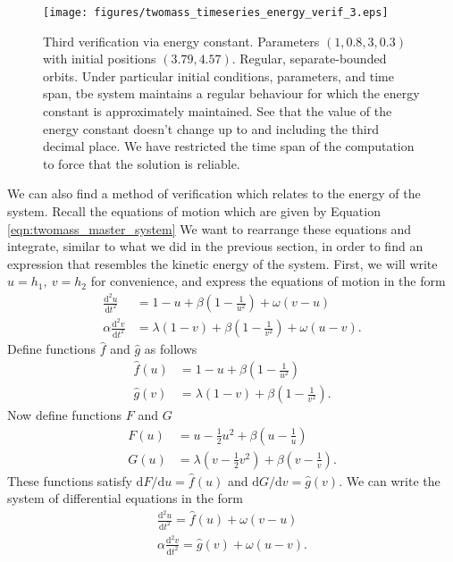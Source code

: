\documentclass{article}
\begin{document}
\begin{figure}
    \centering
    \texttt{[image: figures/twomass\_timeseries\_energy\_verif\_3.eps]}
    \caption{
        Third verification via energy constant.
        Parameters \((1, 0.8, 3, 0.3)\) with initial positions \((3.79, 4.57)\).
        Regular, separate-bounded orbits.
        Under particular initial conditions, parameters, and time span,
        tbe system maintains a regular behaviour for which the energy constant is approximately maintained.
        See that the value of the energy constant doesn't change up to and including the third decimal place.
        We have restricted the time span of the computation to force that the solution is reliable.
    }
    \label{fig:twomass_energy_3}
\end{figure}
We can also find a method of verification which relates to the energy of the system.
Recall the equations of motion which are given by Equation \ref{eqn:twomass_master_system}
We want to rearrange these equations and integrate, similar to what we did in the previous section, in order to find an expression that resembles the kinetic energy of the system.
First, we will write \(u = h_1,~v=h_2\) for convenience, and express the equations of motion in the form
\begin{align*}
    \frac{\mathrm{d}^2 u}{\mathrm{d}t^2} &= 1 - u + \beta\left(1-\frac{1}{u^2}\right) + \omega(v-u) \\
    \alpha\frac{\mathrm{d}^2 v}{\mathrm{d}t^2} &= \lambda(1 - v) + \beta\left(1-\frac{1}{v^2}\right) + \omega(u-v).
\end{align*}
Define functions $\hat{f}$ and $\hat{g}$ as follows
\begin{align*}
    \hat{f}(u) &= 1-u + \beta\left(1-\frac{1}{u^2}\right) \\
    \hat{g}(v) &= \lambda(1-v) + \beta\left( 1-\frac{1}{v^2} \right).
\end{align*}
Now define functions $F$ and $G$
\begin{align*}
    F(u) &= u - \frac{1}{2}u^2 + \beta\left(u - \frac{1}{u} \right) \\
    G(u) &= \lambda\left( v - \frac{1}{2}v^2 \right) + \beta\left( v - \frac{1}{v}\right).
\end{align*}
These functions satisfy \(\mathrm{d}F/\mathrm{d}u = \hat{f}(u)\) and \(\mathrm{d}G/\mathrm{d}v = \hat{g}(v)\).
We can write the system of differential equations in the form
\begin{align*}
    \frac{\mathrm{d}^2 u}{\mathrm{d}t^2} = \hat{f}(u) + \omega(v-u) \\
    \alpha\frac{\mathrm{d}^2 v}{\mathrm{d}t^2} = \hat{g}(v) + \omega(u-v).
\end{align*}
\end{document}
